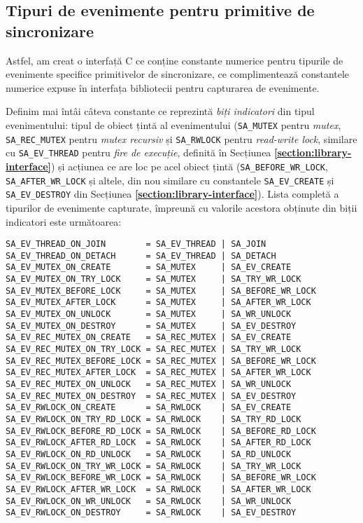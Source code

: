 \subsection{Tipuri de evenimente pentru primitive de sincronizare}
\label{section:event-types}

Astfel, am creat
o interfață C ce conține constante numerice pentru tipurile de
evenimente specifice primitivelor de sincronizare, ce complimentează
constantele numerice expuse în interfața bibliotecii pentru capturarea
de evenimente.

Definim mai întâi câteva constante ce reprezintă
\textit{biți indicatori} din tipul evenimentului: tipul de obiect
țintă al evenimentului (\lstinline{SA_MUTEX} pentru \textit{mutex},
\lstinline{SA_REC_MUTEX} pentru \textit{mutex recursiv} și
\lstinline{SA_RWLOCK} pentru \textit{read-write lock}, similare cu
\lstinline{SA_EV_THREAD} pentru \textit{fire de execuție}, definită în
Secțiunea \textbf{\ref{section:library-interface}}) și acțiunea ce are
loc pe acel obiect țintă (\lstinline{SA_BEFORE_WR_LOCK},
\lstinline{SA_AFTER_WR_LOCK} și altele, din nou similare cu constantele
\lstinline{SA_EV_CREATE} și \lstinline{SA_EV_DESTROY} din Secțiunea
\textbf{\ref{section:library-interface}}). Lista completă a tipurilor de
evenimente capturate, împreună cu valorile acestora obținute din biții
indicatori este următoarea:

\begin{lstlisting}[caption=Tipurile de evenimente pentru primitivele de
                           sincronizare, label=code:syan-event-types]
SA_EV_THREAD_ON_JOIN        = SA_EV_THREAD | SA_JOIN
SA_EV_THREAD_ON_DETACH      = SA_EV_THREAD | SA_DETACH
SA_EV_MUTEX_ON_CREATE       = SA_MUTEX     | SA_EV_CREATE
SA_EV_MUTEX_ON_TRY_LOCK     = SA_MUTEX     | SA_TRY_WR_LOCK
SA_EV_MUTEX_BEFORE_LOCK     = SA_MUTEX     | SA_BEFORE_WR_LOCK
SA_EV_MUTEX_AFTER_LOCK      = SA_MUTEX     | SA_AFTER_WR_LOCK
SA_EV_MUTEX_ON_UNLOCK       = SA_MUTEX     | SA_WR_UNLOCK
SA_EV_MUTEX_ON_DESTROY      = SA_MUTEX     | SA_EV_DESTROY
SA_EV_REC_MUTEX_ON_CREATE   = SA_REC_MUTEX | SA_EV_CREATE
SA_EV_REC_MUTEX_ON_TRY_LOCK = SA_REC_MUTEX | SA_TRY_WR_LOCK
SA_EV_REC_MUTEX_BEFORE_LOCK = SA_REC_MUTEX | SA_BEFORE_WR_LOCK
SA_EV_REC_MUTEX_AFTER_LOCK  = SA_REC_MUTEX | SA_AFTER_WR_LOCK
SA_EV_REC_MUTEX_ON_UNLOCK   = SA_REC_MUTEX | SA_WR_UNLOCK
SA_EV_REC_MUTEX_ON_DESTROY  = SA_REC_MUTEX | SA_EV_DESTROY
SA_EV_RWLOCK_ON_CREATE      = SA_RWLOCK    | SA_EV_CREATE
SA_EV_RWLOCK_ON_TRY_RD_LOCK = SA_RWLOCK    | SA_TRY_RD_LOCK
SA_EV_RWLOCK_BEFORE_RD_LOCK = SA_RWLOCK    | SA_BEFORE_RD_LOCK
SA_EV_RWLOCK_AFTER_RD_LOCK  = SA_RWLOCK    | SA_AFTER_RD_LOCK
SA_EV_RWLOCK_ON_RD_UNLOCK   = SA_RWLOCK    | SA_RD_UNLOCK
SA_EV_RWLOCK_ON_TRY_WR_LOCK = SA_RWLOCK    | SA_TRY_WR_LOCK
SA_EV_RWLOCK_BEFORE_WR_LOCK = SA_RWLOCK    | SA_BEFORE_WR_LOCK
SA_EV_RWLOCK_AFTER_WR_LOCK  = SA_RWLOCK    | SA_AFTER_WR_LOCK
SA_EV_RWLOCK_ON_WR_UNLOCK   = SA_RWLOCK    | SA_WR_UNLOCK
SA_EV_RWLOCK_ON_DESTROY     = SA_RWLOCK    | SA_EV_DESTROY
\end{lstlisting}
